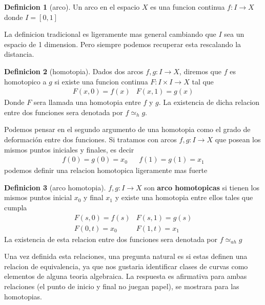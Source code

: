 \documentclass[letterpaper]{article}
\theoremstyle{definition}
\newtheorem{definicion}{Definicion}
\theoremstyle{plain}
\begin{document}
\begin{definicion}[arco]
  Un arco en el espacio \(X\) es una funcion continua \(f : I \to X \)
  donde \(I = [0,1]\)
\end{definicion}
La definicion tradicional es ligeramente mas general cambiando que \(I\)
sea un espacio de 1 dimension. Pero siempre podemos recuperar esta
rescalando la distancia.

\begin{definicion}[homotopia]
  Dados dos arcos \(f,g : I \to X\), diremos que \(f\) es homotopico a
  \(g\) si existe una funcion continua \(F : I \times I \to X \) tal que
  \[ \begin{matrix}
      F (x, 0) = f(x) & F (x, 1) = g(x)
     \end{matrix}
  \]
  Donde \(F\) sera llamada una homotopia entre \(f\) y \(g\). La
  existencia de dicha relacion entre dos funciones sera denotada por \(f
  \simeq_{h} g\).
\end{definicion}
Podemos pensar en el segundo argumento de una homotopia como el grado de
deformación entre dos funciones.
Si tratamos con arcos \(f,g : I \to X\) que posean los mismos puntos
iniciales y finales, es decir
\[ \begin{matrix}
    f(0) = g(0) = x_0  & & f(1) = g(1) = x_1
   \end{matrix}
\]
podemos definir una relacion homotopica ligeramente mas fuerte
\begin{definicion}[arco homotopia]
  \(f,g : I \to X\) son \textbf{arco homotopicas} si tienen los mismos
  puntos inicial \(x_0\) y final \(x_1\) y existe una homotopia entre
  ellos tales que cumpla
  \[
    \begin{matrix}
      F(s,0) = f(s) & F(s,1) = g(s) \\
      F(0,t) = x_0  & F(1,t) = x_1
    \end{matrix}
  \]
  La existencia de esta relacion entre dos funciones sera denotada por
  \(f \simeq_{ah} g\)
\end{definicion}
Una vez definida esta relaciones, una pregunta natural es si estas definen
una relacion de equivalencia, ya que nos gustaria identificar clases de
curvas como elementos de alguna teoria algebraica. La respuesta es
afirmativa para ambas relaciones (el punto de inicio y final no juegan
papel), se mostrara para las homotopias.
\end{document}
